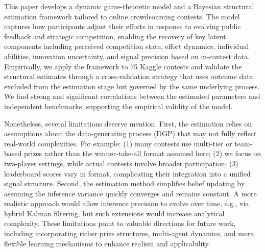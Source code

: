 \documentclass[mnsc]{informs3}
\begin{document}
This paper develops a dynamic game-theoretic model and a Bayesian structural estimation framework tailored to online crowdsourcing contests.
The model captures how participants adjust their efforts in response to evolving public feedback and strategic competition, enabling the recovery of key latent components including perceived competition state, effort dynamics, individual abilities, innovation uncertainty, and signal precision based on in-contest data.
Empirically, we apply the framework to 75 Kaggle contests and validate the structural estimates through a cross-validation strategy that uses outcome data excluded from the estimation stage but governed by the same underlying process.
We find strong and significant correlations between the estimated parameters and independent benchmarks, supporting the empirical validity of the model.


Nonetheless, several limitations deserve mention.
First, the estimation relies on assumptions about the data-generating process (DGP) that may not fully reflect real-world complexities.
For example:
(1) many contests use multi-tier or team-based prizes rather than the winner-take-all format assumed here;
(2) we focus on two-player settings, while actual contests involve broader participation;
(3) leaderboard scores vary in format, complicating their integration into a unified signal structure.
Second, the estimation method simplifies belief updating by assuming the inference variance quickly converges and remains constant.
A more realistic approach would allow inference precision to evolve over time, e.g., via hybrid Kalman filtering, but such extensions would increase analytical complexity.
These limitations point to valuable directions for future work, including incorporating richer prize structures, multi-agent dynamics, and more flexible learning mechanisms to enhance realism and applicability.




%
%
%
\end{document}
